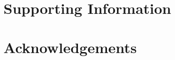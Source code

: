 \documentclass[10pt,letterpaper]{article}
\begin{document}
\section*{Supporting Information}

%
%
%
%

\section*{Acknowledgements}
\end{document}
